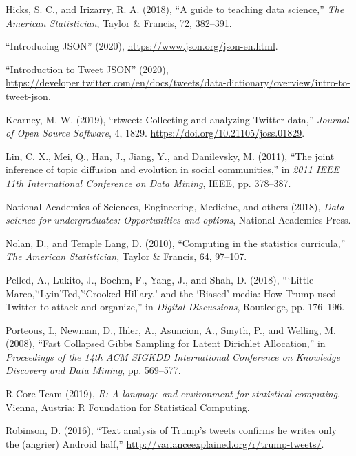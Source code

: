 \documentclass[
]{article}
\begin{document}
\leavevmode\hypertarget{ref-hicks2018guide}{}%
Hicks, S. C., and Irizarry, R. A. (2018), ``A guide to teaching data science,'' \emph{The American Statistician}, Taylor \& Francis, 72, 382--391.

\leavevmode\hypertarget{ref-json}{}%
``Introducing JSON'' (2020), \url{https://www.json.org/json-en.html}.

\leavevmode\hypertarget{ref-tweet_json}{}%
``Introduction to Tweet JSON'' (2020), \url{https://developer.twitter.com/en/docs/tweets/data-dictionary/overview/intro-to-tweet-json}.

\leavevmode\hypertarget{ref-rtweet-package}{}%
Kearney, M. W. (2019), ``rtweet: Collecting and analyzing Twitter data,'' \emph{Journal of Open Source Software}, 4, 1829. \url{https://doi.org/10.21105/joss.01829}.

\leavevmode\hypertarget{ref-lin2011joint}{}%
Lin, C. X., Mei, Q., Han, J., Jiang, Y., and Danilevsky, M. (2011), ``The joint inference of topic diffusion and evolution in social communities,'' in \emph{2011 IEEE 11th International Conference on Data Mining}, IEEE, pp. 378--387.

\leavevmode\hypertarget{ref-national2018data}{}%
National Academies of Sciences, Engineering, Medicine, and others (2018), \emph{Data science for undergraduates: Opportunities and options}, National Academies Press.

\leavevmode\hypertarget{ref-nolan2010computing}{}%
Nolan, D., and Temple Lang, D. (2010), ``Computing in the statistics curricula,'' \emph{The American Statistician}, Taylor \& Francis, 64, 97--107.

\leavevmode\hypertarget{ref-pelled2018little}{}%
Pelled, A., Lukito, J., Boehm, F., Yang, J., and Shah, D. (2018), ```Little Marco,'`Lyin'Ted,'`Crooked Hillary,' and the `Biased' media: How Trump used Twitter to attack and organize,'' in \emph{Digital Discussions}, Routledge, pp. 176--196.

\leavevmode\hypertarget{ref-porteous2008fast}{}%
Porteous, I., Newman, D., Ihler, A., Asuncion, A., Smyth, P., and Welling, M. (2008), ``Fast Collapsed Gibbs Sampling for Latent Dirichlet Allocation,'' in \emph{Proceedings of the 14th ACM SIGKDD International Conference on Knowledge Discovery and Data Mining}, pp. 569--577.

\leavevmode\hypertarget{ref-r}{}%
R Core Team (2019), \emph{R: A language and environment for statistical computing}, Vienna, Austria: R Foundation for Statistical Computing.

\leavevmode\hypertarget{ref-drob}{}%
Robinson, D. (2016), ``Text analysis of Trump's tweets confirms he writes only the (angrier) Android half,'' \url{http://varianceexplained.org/r/trump-tweets/}.
\end{document}
